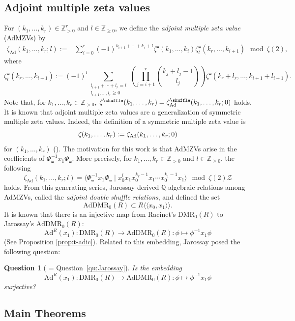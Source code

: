 \documentclass[15pt,oneside,reqno]{amsart}
\newtheorem{qu}[df]{Question}
\theoremstyle{remark}{
\newtheorem{lem}[df]{Lemma}
\newtheorem{prop}[df]{Proposition}
\newtheorem{ex}[df]{Example}
\newtheorem{rmk}[df]{Remark}
}
\newcommand{\DMR}{\mathrm{DMR}}
\newcommand{\AdDMR}{\mathrm{AdDMR}}
\newcommand{\Ad}{\mathrm{Ad}}
\let\S\relax
\newcommand{\S}{\mathcal{S}}
\newcommand{\Admzv}[2]{\zeta_{\mathrm{Ad}}(#2;#1)}
\newcommand{\sAdmzv}[2]{\zeta_{\mathrm{Ad}}^{\shuffle}(#2;#1)}
\begin{document}
\subsection{Adjoint multiple zeta values}



For $(k_1,\ldots,k_r) \in \mathbb{Z}_{>0}^r$ and $l\in \mathbb{Z}_{\ge 0}$, we define the \emph{adjoint multiple zeta value} (AdMZVs) by
\begin{align*}
\Admzv{l}{k_1,\ldots,k_r} :=& \sum_{i = 0}^r (-1)^{k_{i+1}+\cdots+k_r + l} \zeta^{\shuffle}(k_1,\ldots,k_i)\zeta^{\shuffle}_l(k_r,\ldots,k_{i+1}) \mod \zeta(2),
\end{align*}
where
\[
\zeta_{l}^{\shuffle}(k_r,\ldots,k_{i+1}) := (-1)^l \sum_{\substack{l_{i+1}+\cdots+l_r = l \\ l_{i+1},\ldots,l_r\ge 0}}
\left(\prod_{j = i+1}^r \binom{k_j + l_j-1}{l_j}\right)
\zeta^{\shuffle}(k_r+l_r,\ldots,k_{i+1}+l_{i+1}).
\]
Note that, for $k_1,\ldots,k_r \in \mathbb{Z}_{>0}$, $\zeta_{\S}^{\shuffle}(k_1,\ldots,k_r) = \sAdmzv{0}{k_1,\ldots,k_r}$ holds.
It is known that adjoint multiple zeta values are a generalization of symmetric multiple zeta values. Indeed, the definition of a symmetric multiple zeta value is
\[
\zeta_{\S}(k_1,\ldots,k_r) := \Admzv{0}{k_1,\ldots,k_r}
\]
for $(k_1,\ldots,k_r)$ (\cite{Kaneko-Zagier}).
The motivation for this work is that AdMZVs arise in the coefficients of $\Phi_{\shuffle}^{-1}x_1 \Phi_{\shuffle}$.
More precisely, for $k_1,\ldots,k_r \in \mathbb{Z}_{>0}$ and $l\in \mathbb{Z}_{\ge 0}$, the following
\[
\Admzv{l}{k_1,\ldots,k_r} = \langle \Phi_{\shuffle}^{-1}x_1\Phi_{\shuffle} \mid x_0^lx_1x_0^{k_r-1}x_1\cdots x_0^{k_1-1}x_1 \rangle \mod \zeta(2)\mathcal{Z}
\]
holds.
From this generating series, Jarossay derived $\mathbb{Q}$-algebraic relations among AdMZVs, called the \emph{adjoint double shuffle relations}, and defined the set
\[
\AdDMR_0(R)\subset R\langle\!\langle x_0,x_1\rangle\!\rangle .
\]
It is known that there is an injective map from Racinet's $\DMR_0(R)$ to Jarossay's $\AdDMR_0(R)$:
\[
\Ad^R(x_1) : \DMR_0(R) \rightarrow \AdDMR_0(R) : \phi \mapsto \phi^{-1}x_1\phi
\]
(See Proposition \ref{prop:t-adic}).
Related to this embedding, Jarossay posed the following question:
\begin{qu}[ = Question~\ref{qu:Jarossay}]\label{qu:Jarossay-qu}
Is the embedding
\[
\Ad^R(x_1) : \DMR_0(R) \rightarrow \AdDMR_0(R) : \phi \mapsto \phi^{-1}x_1\phi
\]
surjective?
\end{qu}

\subsection{Main Theorems}
\end{document}
